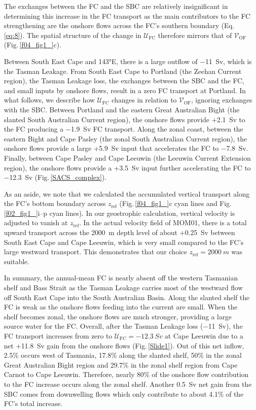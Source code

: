 \documentclass[preprint,3p,review,12pt]{elsarticle}
\newcommand{\sub}[1]{_{\text{#1}}}
\begin{document}
The exchanges between the FC and the SBC are relatively insignificant in determining this increase in the FC transport as the main contributors to the FC strengthening are the
onshore flows
across the FC's southern boundary (Eq.\,\ref{eq:8}).
The spatial structure of the change
in $\mathcal{U}\sub{FC}$ therefore mirrors
that of $\mathcal{V}\sub{OF}$ (Fig.\,\ref{f04_fig1_}c).

Between South East Cape and \ang{143}E, there is a large outflow of \SI{-11}{Sv},
which is the Tasman Leakage.
From South East Cape to Portland (the Zeehan Current region), the Tasman Leakage loss, the exchanges between the SBC and the FC, and small inputs by onshore flows, result in a zero FC transport at Portland.
In what follows, we describe how $\mathcal{U}\sub{FC}$ changes
in relation to $\mathcal{V}\sub{OF}$, ignoring exchanges with the SBC\@.
%
Between Portland and the eastern Great Australian Bight (the slanted South Australian Current region), the onshore flows provide +\SI{2.1}{Sv} to the FC producing a \SI{-1.9}{Sv} FC transport.
Along the zonal coast, between the eastern Bight
and Cape Pasley (the zonal South Australian Current region), the onshore flows provide a large +\SI{5.9}{Sv} input that
accelerates the FC to \SI{-7.8}{Sv}. Finally, between Cape Pasley and Cape Leeuwin (the Leeuwin Current Extension region), the onshore flows provide a +\SI{3.5}{Sv} input further accelerating the FC to \SI{-12.3}{Sv} (Fig.\,\ref{SACS_complex}).

As an aside, we note that we calculated the accumulated vertical transport along the FC's bottom boundary across $z\sub{ref}$ (Fig.\,\ref{f04_fig1_}c cyan lines and Fig.\,\ref{f02_fig1_}i--p cyan lines).
In our geostrophic calculation, vertical velocity is adjusted to vanish at $z\sub{ref}$.
In the actual velocity field of MOM01, there is a total
upward transport across the \SI{2000}{\meter} depth level of about +\SI{0.25}{Sv}
between South East Cape and Cape Leeuwin, which is very small compared to the FC's large westward transport.
This demonstrates that our choice $z\sub{ref} = \SI{2000}{m}$
was suitable.

In summary, the annual-mean FC is nearly absent off the western Tasmanian shelf and Bass Strait as the Tasman Leakage carries
most
of the westward flow off South East Cape into the South Australian Basin. Along the slanted shelf the FC is weak as the onshore flows feeding into the current are small. When the shelf becomes zonal,
the onshore flows are much stronger, providing a large source water for the FC\@.
Overall, after the Tasman Leakage loss (\SI{-11}{Sv}),
the FC transport increases from zero to $\mathcal{U}\sub{FC} = \SI{-12.3}{Sv}$
at Cape Leeuwin due to a net +\SI{11.8}{Sv} gain from the onshore flows (Fig.\,\ref{Slide1}). Out of this net inflow, 2.5\% occurs west of Tasmania, 17.8\% along the slanted shelf, 50\% in the zonal Great Australian Bight region and 29.7\% in the zonal shelf region from Cape Carnot to Cape Leeuwin. Therefore, nearly 80\% of the onshore flow contribution to the FC increase occurs along the zonal shelf. Another \SI{+0.5}{Sv} net gain from the SBC comes from downwelling flows which only contribute to about 4.1\% of the FC's total increase. 
\end{document}
